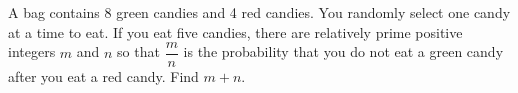 A bag contains $8$ green candies and 4 red candies. You randomly select one candy at a time to eat. If you eat five candies, there are relatively prime positive integers $m$ and $n$ so that $\dfrac{m}{n}$ is the probability that you do not eat a green candy after you eat a red candy. Find $m + n$.
